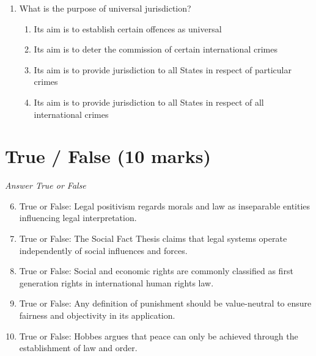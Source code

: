 \documentclass[12pt]{article}
\begin{document}
\begin{enumerate}[label=\arabic*.]
\begin{enumerate}[label=(\alph*)]
    \item Sovereignty means being recognised by all other States
    \item Sovereignty means to be able to enter into treaties and join the UN
    \item Sovereignty means freedom to determine one's own affairs without external interference
    \item Sovereignty means possessing the right to defend oneself
\end{enumerate}
\item What is the purpose of universal jurisdiction?
\begin{enumerate}[label=(\alph*)]
    \item Its aim is to establish certain offences as universal
    \item Its aim is to deter the commission of certain international crimes
    \item Its aim is to provide jurisdiction to all States in respect of particular crimes
    \item Its aim is to provide jurisdiction to all States in respect of all international crimes
\end{enumerate}
\end{enumerate}

\section*{True / False (10 marks)}
\textit{Answer True or False}
\begin{enumerate}[label=\arabic*.]
\setcounter{enumi}{5}
\item True or False: Legal positivism regards morals and law as inseparable entities influencing legal interpretation.
\item True or False: The Social Fact Thesis claims that legal systems operate independently of social influences and forces.
\item True or False: Social and economic rights are commonly classified as first generation rights in international human rights law.
\item True or False: Any definition of punishment should be value-neutral to ensure fairness and objectivity in its application.
\item True or False: Hobbes argues that peace can only be achieved through the establishment of law and order.
\end{enumerate}
\end{document}
